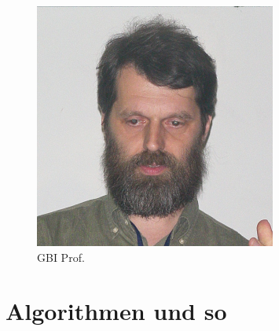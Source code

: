 \documentclass[
    narrow,
    fontstyle=light,
    babelparam=ngerman
]{elite}
\begin{document}
\begin{CodeListing}[title=manuelle Wrapfig]
\begin{figure}
    \includegraphics[width=0.9\linewidth]{./worsch}
    \caption{GBI Prof.}
    \label{fig:wrapfigure}
\end{figure}
\end{CodeListing}

\newpage


\blindtext

\begin{CodeListing}[title=Macro Wrapfigure]
\end{CodeListing}

\newpage
\section{Algorithmen und so}
\blindtext\blindtext\blindtext\blindtext\blindtext\
\end{document}
